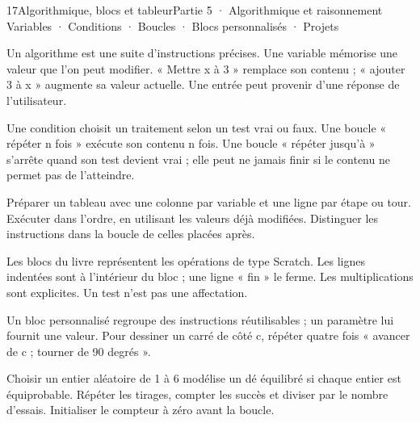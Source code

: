 \begin{ouverture}[algorithmique]{17}{Algorithmique, blocs et tableur}{Partie 5 · Algorithmique et raisonnement}
{Variables · Conditions · Boucles · Blocs personnalisés · Projets}
\end{ouverture}
\pagestyle{otMain}\essentiel\fontsize{11}{15}\selectfont
{}
\begin{definition}Un algorithme est une suite d’instructions précises. Une variable mémorise une valeur que l’on peut modifier. « Mettre x à 3 » remplace son contenu ; « ajouter 3 à x » augmente sa valeur actuelle. Une entrée peut provenir d’une réponse de l’utilisateur.\end{definition}
\begin{definition}Une condition choisit un traitement selon un test vrai ou faux. Une boucle « répéter n fois » exécute son contenu n fois. Une boucle « répéter jusqu’à » s’arrête quand son test devient vrai ; elle peut ne jamais finir si le contenu ne permet pas de l’atteindre.\end{definition}
\begin{savoirfaire}Préparer un tableau avec une colonne par variable et une ligne par étape ou tour. Exécuter dans l’ordre, en utilisant les valeurs déjà modifiées. Distinguer les instructions dans la boucle de celles placées après.\end{savoirfaire}
\begin{attention}Les blocs du livre représentent les opérations de type Scratch. Les lignes indentées sont à l’intérieur du bloc ; une ligne « fin » le ferme. Les multiplications sont explicites. Un test n’est pas une affectation.\end{attention}
\clearpage
{}
\begin{definition}Un bloc personnalisé regroupe des instructions réutilisables ; un paramètre lui fournit une valeur. Pour dessiner un carré de côté c, répéter quatre fois « avancer de c ; tourner de 90 degrés ».\end{definition}
\begin{savoirfaire}[Simuler]Choisir un entier aléatoire de 1 à 6 modélise un dé équilibré si chaque entier est équiprobable. Répéter les tirages, compter les succès et diviser par le nombre d’essais. Initialiser le compteur à zéro avant la boucle.\end{savoirfaire}
